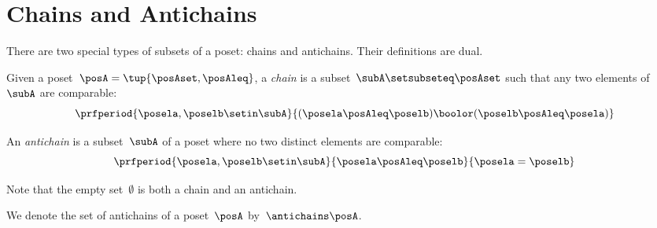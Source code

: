 
\section{Chains and Antichains}
\label{sec:chains-antichains}

There are two special types of subsets of a poset: chains and antichains.
Their definitions are dual.

\begin{definition}
    \label{def:chain}
    Given a poset~$\posA = \tup{\posAset, \posAleq}$, a \emph{chain} is a subset~$\subA \setsubseteq \posAset$ such that any two elements of~$\subA$ are comparable:
    \begin{equation*}
        \prfperiod{
            \posela,\poselb \setin \subA
        }{
            (\posela \posAleq  \poselb) \boolor (\poselb \posAleq  \posela)
        }
    \end{equation*}
\end{definition}

\begin{definition}
    \label{def:antichain}
    An \emph{antichain} is a subset~$\subA$ of a poset where no two distinct elements are comparable:
    \begin{equation*}
        \prfperiod{
            \posela,\poselb \setin \subA
        }{
            \posela \posAleq \poselb
        }{
            \posela = \poselb
        }
    \end{equation*}
\end{definition}
\begin{remark}
    Note that the empty set~$\emptyset$ is both a chain and an antichain.
\end{remark}

We denote the set of antichains of a poset~$\posA$ by~$\antichains\posA$.

